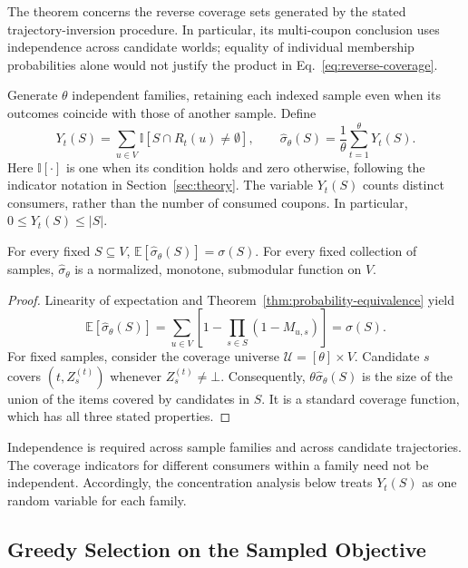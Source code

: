 \documentclass[sigconf]{acmart}
\begin{document}
The theorem concerns the reverse coverage sets generated by the
stated trajectory-inversion procedure. In particular, its
multi-coupon conclusion uses independence across candidate worlds;
equality of individual membership probabilities alone would not
justify the product in Eq.~\eqref{eq:reverse-coverage}.

Generate $\theta$ independent families, retaining each indexed
sample even when its outcomes coincide with those of another sample.
Define
\begin{equation}
\label{eq:empirical-spread}
 Y_t(S)=\sum_{u\in V}\mathbb{I}[S\cap R_t(u)\ne\emptyset],
 \qquad
 \hat\sigma_\theta(S)=\frac1\theta\sum_{t=1}^\theta Y_t(S).
\end{equation}
Here $\mathbb{I}[\cdot]$ is one when its condition holds and zero
otherwise, following the indicator notation in Section~\ref{sec:theory}.
The variable $Y_t(S)$ counts distinct consumers, rather than the number
of consumed coupons. In particular, $0\le Y_t(S)\le |S|$.

\begin{lemma}
\label{lem:unbiased}
For every fixed $S\subseteq V$,
$\mathbb E[\hat\sigma_\theta(S)]=\sigma(S)$.
For every fixed collection of samples, $\hat\sigma_\theta$ is a
normalized, monotone, submodular function on $V$.
\end{lemma}
\begin{proof}\renewcommand{\qedsymbol}{}
Linearity of expectation and Theorem~\ref{thm:probability-equivalence} yield
\[
 \mathbb E[\hat\sigma_\theta(S)]
 =\sum_{u\in V}\left[1-\prod_{s\in S}(1-M_{u,s})\right]
 =\sigma(S).
\]
For fixed samples, consider the coverage universe
$\mathcal U=[\theta]\times V$. Candidate $s$ covers
$(t,Z_s^{(t)})$ whenever $Z_s^{(t)}\ne\bot$.
Consequently, $\theta\hat\sigma_\theta(S)$ is the size of the
union of the items covered by candidates in $S$.
It is a standard coverage function, which has all three stated
properties.
\end{proof}

Independence is required across sample families and across
candidate trajectories. The coverage indicators for different
consumers within a family need not be independent. Accordingly,
the concentration analysis below treats $Y_t(S)$ as one random
variable for each family.

\subsection{Greedy Selection on the Sampled Objective}
\label{sec:greedy-selection}
\end{document}
